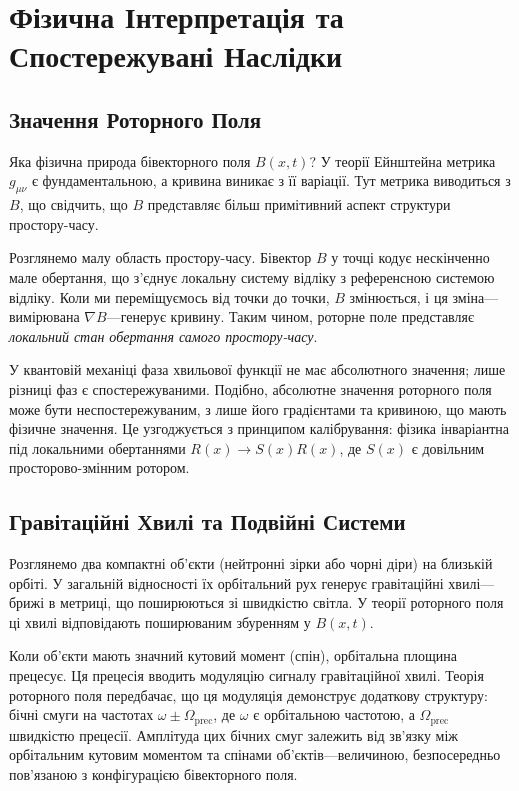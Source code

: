 \documentclass[11pt,a4paper]{article}
\numberwithin{equation}{section}
\theoremstyle{plain}
\theoremstyle{definition}
\theoremstyle{remark}
\begin{document}
\section{Фізична Інтерпретація та Спостережувані Наслідки}
\label{sec:physical}

\subsection{Значення Роторного Поля}

Яка фізична природа бівекторного поля $B(x,t)$? У теорії Ейнштейна метрика $g_{\mu\nu}$ є фундаментальною, а кривина виникає з її варіації. Тут метрика виводиться з $B$, що свідчить, що $B$ представляє більш примітивний аспект структури простору-часу.

Розглянемо малу область простору-часу. Бівектор $B$ у точці кодує нескінченно мале обертання, що з'єднує локальну систему відліку з референсною системою відліку. Коли ми переміщуємось від точки до точки, $B$ змінюється, і ця зміна---вимірювана $\nabla B$---генерує кривину. Таким чином, роторне поле представляє \emph{локальний стан обертання самого простору-часу}.

У квантовій механіці фаза хвильової функції не має абсолютного значення; лише різниці фаз є спостережуваними. Подібно, абсолютне значення роторного поля може бути неспостережуваним, з лише його градієнтами та кривиною, що мають фізичне значення. Це узгоджується з принципом калібрування: фізика інваріантна під локальними обертаннями $R(x) \to S(x)R(x)$, де $S(x)$ є довільним просторово-змінним ротором.

\subsection{Гравітаційні Хвилі та Подвійні Системи}

Розглянемо два компактні об'єкти (нейтронні зірки або чорні діри) на близькій орбіті. У загальній відносності їх орбітальний рух генерує гравітаційні хвилі---брижі в метриці, що поширюються зі швидкістю світла. У теорії роторного поля ці хвилі відповідають поширюваним збуренням у $B(x,t)$.

Коли об'єкти мають значний кутовий момент (спін), орбітальна площина прецесує. Ця прецесія вводить модуляцію сигналу гравітаційної хвилі. Теорія роторного поля передбачає, що ця модуляція демонструє додаткову структуру: бічні смуги на частотах $\omega \pm \Omega_{\mathrm{prec}}$, де $\omega$ є орбітальною частотою, а $\Omega_{\mathrm{prec}}$ швидкістю прецесії. Амплітуда цих бічних смуг залежить від зв'язку між орбітальним кутовим моментом та спінами об'єктів---величиною, безпосередньо пов'язаною з конфігурацією бівекторного поля.
\end{document}
